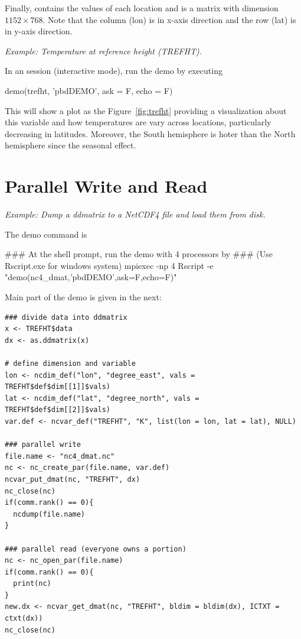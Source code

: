 Finally,  contains the values of each
location and is a matrix with dimension $1152\times 768$. Note that the column 
(lon) is in x-axis direction and the row (lat) is in y-axis direction.


\emph{Example: Temperature at reference height (TREFHT).}

In an  session (interactive mode), run the demo by executing
\begin{Code}[title=R Code]
demo(trefht, 'pbdDEMO', ask = F, echo = F)
\end{Code}
This will show a plot as the Figure~\ref{fig:trefht} providing a
visualization about this variable and how temperatures are vary
across locations, particularly decreasing in latitudes. Moreover, the
South hemisphere is hoter than the North hemisphere since the seasonal
effect.



\section{Parallel Write and Read}

\emph{Example: Dump a ddmatrix to a NetCDF4 file and load them from disk.}

The demo command is
\begin{Command}
### At the shell prompt, run the demo with 4 processors by
### (Use Rscript.exe for windows system)
mpiexec -np 4 Rscript -e "demo(nc4_dmat,'pbdDEMO',ask=F,echo=F)"
\end{Command}

Main part of the demo is given in the next:
\begin{lstlisting}[language=rr,title=nc4\_dmat]
### divide data into ddmatrix
x <- TREFHT$data
dx <- as.ddmatrix(x)

# define dimension and variable
lon <- ncdim_def("lon", "degree_east", vals = TREFHT$def$dim[[1]]$vals)
lat <- ncdim_def("lat", "degree_north", vals = TREFHT$def$dim[[2]]$vals)
var.def <- ncvar_def("TREFHT", "K", list(lon = lon, lat = lat), NULL)

### parallel write
file.name <- "nc4_dmat.nc"
nc <- nc_create_par(file.name, var.def)
ncvar_put_dmat(nc, "TREFHT", dx)
nc_close(nc)
if(comm.rank() == 0){
  ncdump(file.name)
}

### parallel read (everyone owns a portion)
nc <- nc_open_par(file.name)
if(comm.rank() == 0){
  print(nc)
}
new.dx <- ncvar_get_dmat(nc, "TREFHT", bldim = bldim(dx), ICTXT = ctxt(dx))
nc_close(nc)
\end{lstlisting}

